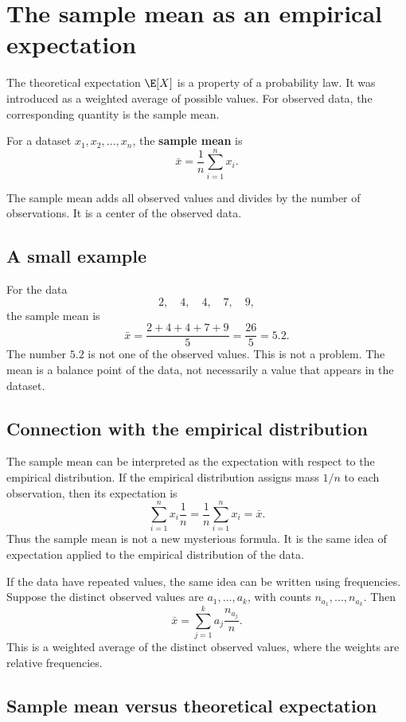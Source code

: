 \section{The sample mean as an empirical expectation}

The theoretical expectation \(\E[X]\) is a property of a probability law. It was
introduced as a weighted average of possible values. For observed data, the
corresponding quantity is the sample mean.

\begin{definitionbox}
For a dataset \(x_1,x_2,\ldots,x_n\), the \textbf{sample mean} is
\[
\bar{x}=\frac1n\sum_{i=1}^n x_i.
\]
\end{definitionbox}

The sample mean adds all observed values and divides by the number of
observations. It is a center of the observed data.

\subsection*{A small example}

For the data
\[
2,\quad 4,\quad 4,\quad 7,\quad 9,
\]
the sample mean is
\[
\bar{x}=\frac{2+4+4+7+9}{5}=\frac{26}{5}=5.2.
\]
The number \(5.2\) is not one of the observed values. This is not a problem. The
mean is a balance point of the data, not necessarily a value that appears in the
dataset.

\subsection*{Connection with the empirical distribution}

The sample mean can be interpreted as the expectation with respect to the
empirical distribution. If the empirical distribution assigns mass \(1/n\) to
each observation, then its expectation is
\[
\sum_{i=1}^n x_i\frac1n=\frac1n\sum_{i=1}^n x_i=\bar{x}.
\]
Thus the sample mean is not a new mysterious formula. It is the same idea of
expectation applied to the empirical distribution of the data.

If the data have repeated values, the same idea can be written using frequencies.
Suppose the distinct observed values are \(a_1,\ldots,a_k\), with counts
\(n_{a_1},\ldots,n_{a_k}\). Then
\[
\bar{x}=\sum_{j=1}^k a_j\frac{n_{a_j}}{n}.
\]
This is a weighted average of the distinct observed values, where the weights are
relative frequencies.

\subsection*{Sample mean versus theoretical expectation}

